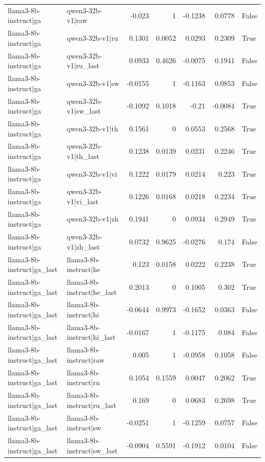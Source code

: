 \begin{table}
\begin{tabular}{l l r r r r l}
llama3-8b-instruct|ga & qwen3-32b-v1|raw & -0.023 & 1 & -0.1238 & 0.0778 & False \\
llama3-8b-instruct|ga & qwen3-32b-v1|ru & 0.1301 & 0.0052 & 0.0293 & 0.2309 & True \\
llama3-8b-instruct|ga & qwen3-32b-v1|ru_last & 0.0933 & 0.4626 & -0.0075 & 0.1941 & False \\
llama3-8b-instruct|ga & qwen3-32b-v1|sw & -0.0155 & 1 & -0.1163 & 0.0853 & False \\
llama3-8b-instruct|ga & qwen3-32b-v1|sw_last & -0.1092 & 0.1018 & -0.21 & -0.0084 & True \\
llama3-8b-instruct|ga & qwen3-32b-v1|th & 0.1561 & 0 & 0.0553 & 0.2568 & True \\
llama3-8b-instruct|ga & qwen3-32b-v1|th_last & 0.1238 & 0.0139 & 0.0231 & 0.2246 & True \\
llama3-8b-instruct|ga & qwen3-32b-v1|vi & 0.1222 & 0.0179 & 0.0214 & 0.223 & True \\
llama3-8b-instruct|ga & qwen3-32b-v1|vi_last & 0.1226 & 0.0168 & 0.0218 & 0.2234 & True \\
llama3-8b-instruct|ga & qwen3-32b-v1|zh & 0.1941 & 0 & 0.0934 & 0.2949 & True \\
llama3-8b-instruct|ga & qwen3-32b-v1|zh_last & 0.0732 & 0.9625 & -0.0276 & 0.174 & False \\
llama3-8b-instruct|ga_last & llama3-8b-instruct|he & 0.123 & 0.0158 & 0.0222 & 0.2238 & True \\
llama3-8b-instruct|ga_last & llama3-8b-instruct|he_last & 0.2013 & 0 & 0.1005 & 0.302 & True \\
llama3-8b-instruct|ga_last & llama3-8b-instruct|hi & -0.0644 & 0.9973 & -0.1652 & 0.0363 & False \\
llama3-8b-instruct|ga_last & llama3-8b-instruct|hi_last & -0.0167 & 1 & -0.1175 & 0.084 & False \\
llama3-8b-instruct|ga_last & llama3-8b-instruct|raw & 0.005 & 1 & -0.0958 & 0.1058 & False \\
llama3-8b-instruct|ga_last & llama3-8b-instruct|ru & 0.1054 & 0.1559 & 0.0047 & 0.2062 & True \\
llama3-8b-instruct|ga_last & llama3-8b-instruct|ru_last & 0.169 & 0 & 0.0683 & 0.2698 & True \\
llama3-8b-instruct|ga_last & llama3-8b-instruct|sw & -0.0251 & 1 & -0.1259 & 0.0757 & False \\
llama3-8b-instruct|ga_last & llama3-8b-instruct|sw_last & -0.0904 & 0.5591 & -0.1912 & 0.0104 & False \\

\end{tabular}
\end{table}
